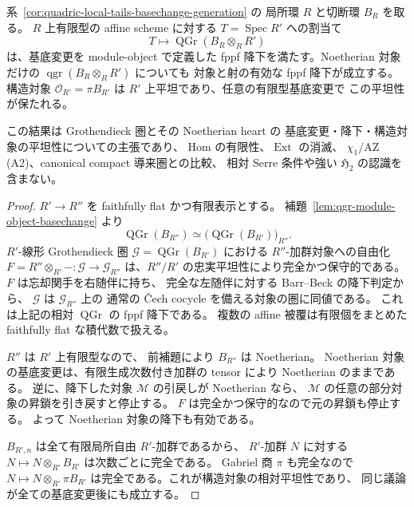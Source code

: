 \begin{corollary}
\label{cor:quadric-local-tails-fppf-descent}
系~\ref{cor:quadric-local-tails-basechange-generation} の
局所環 $R$ と切断環 $B_R$ を取る。
$R$ 上有限型の affine scheme に対する
$T=\operatorname{Spec}R'$ への割当て
\[
   T\longmapsto\operatorname{QGr}(B_R\otimes_RR')
\]
は、基底変更を module-object で定義した
fppf 降下を満たす。Noetherian 対象だけの
$\operatorname{qgr}(B_R\otimes_RR')$ についても
対象と射の有効な fppf 降下が成立する。
構造対象 $\mathcal O_{R'}=\pi B_{R'}$ は
$R'$ 上平坦であり、任意の有限型基底変更で
この平坦性が保たれる。

この結果は Grothendieck 圏とその Noetherian heart の
基底変更・降下・構造対象の平坦性についての主張であり、
Hom の有限性、$\operatorname{Ext}$ の消滅、
$\chi_1$/AZ (A2)、canonical compact 導来圏との比較、
相対 Serre 条件や強い $\mathfrak H_2$ の認識を含まない。
\end{corollary}
\begin{proof}
$R'\to R''$ を faithfully flat かつ有限表示とする。
補題~\ref{lem:qgr-module-object-basechange} より
\[
 \operatorname{QGr}(B_{R''})
 \simeq\bigl(\operatorname{QGr}(B_{R'})\bigr)_{R''}.
\]
$R'$-線形 Grothendieck 圏 $\mathcal G=
\operatorname{QGr}(B_{R'})$ における
$R''$-加群対象への自由化
$F=R''\otimes_{R'}-:\mathcal G\to\mathcal G_{R''}$
は、$R''/R'$ の忠実平坦性により完全かつ保守的である。
$F$ は忘却関手を右随伴に持ち、
完全な左随伴に対する Barr--Beck の降下判定から、
$\mathcal G$ は $\mathcal G_{R''}$ 上の
通常の Čech cocycle を備える対象の圏に同値である。
これは上記の相対 $\operatorname{QGr}$ の fppf 降下である。
複数の affine 被覆は有限個をまとめた
faithfully flat な積代数で扱える。

$R''$ は $R'$ 上有限型なので、
前補題により $B_{R''}$ は Noetherian。
Noetherian 対象の基底変更は、有限生成次数付き加群の
tensor により Noetherian のままである。
逆に、降下した対象 $\mathcal M$ の引戻しが Noetherian なら、
$\mathcal M$ の任意の部分対象の昇鎖を引き戻すと停止する。
$F$ は完全かつ保守的なので元の昇鎖も停止する。
よって Noetherian 対象の降下も有効である。

$B_{R',n}$ は全て有限局所自由 $R'$-加群であるから、
$R'$-加群 $N$ に対する
$N\mapsto N\otimes_{R'}B_{R'}$
は次数ごとに完全である。
Gabriel 商 $\pi$ も完全なので
$N\mapsto N\otimes_{R'}\pi B_{R'}$
は完全である。これが構造対象の相対平坦性であり、
同じ議論が全ての基底変更後にも成立する。
\end{proof}


